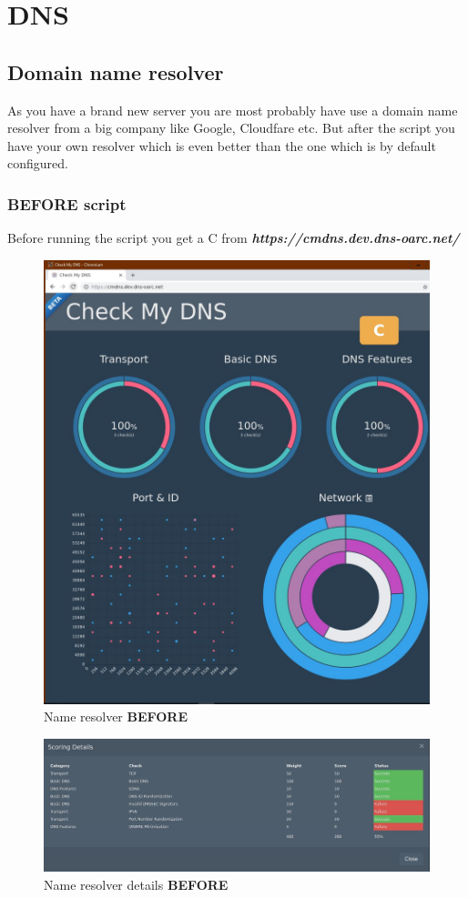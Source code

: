 

\section{DNS}
\subsection{Domain name resolver}
As you have a brand new server you are most probably have use a domain name resolver from a big company like Google, Cloudfare etc. But after the script you have your own resolver which is even better than the one which is by default configured. 
\subsubsection{BEFORE script}
Before running the script you get a C from \textbf{\textit{https://cmdns.dev.dns-oarc.net/} \cite{cmdns}}

\begin{figure}[H]
	\centering
	\includegraphics[width=0.6\linewidth]{pics/score_DNS1_before}
	\caption{Name resolver \textbf{BEFORE}}
	\label{fig:scoredns1before}
\end{figure}

\begin{figure}[H]
	\centering
	\includegraphics[width=0.6\linewidth]{pics/score_DNS2_before}
		\caption{Name resolver details \textbf{BEFORE}}
	\label{fig:scoredns2before}
\end{figure}
\newpage
